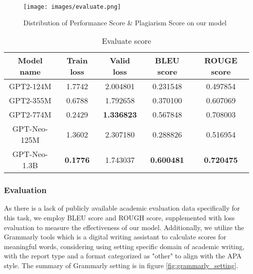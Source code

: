 \documentclass[conference]{IEEEtran}
\begin{document}
\begin{figure}[ht]
    \centerline{\texttt{[image: images/evaluate.png]}}
    \caption{Distribution of Performance Score \& Plagiarism Score on our model}
    \label{fig:evaluate}
\end{figure}
\begin{table}[!h]
    \begin{center}
        \caption{Evaluate score} 
        \begin{tabular}{|c|c|c|c|c|} 
             \hline
              Model name & Train loss & Valid loss & BLEU score & ROUGE score \\ [1ex] 
            \hline

             GPT2-124M & 1.7742 & 2.004801 & 0.231548 & 0.497854 \\ [1ex] 

             GPT2-355M & 0.6788 & 1.792658 & 0.370100 & 0.607069 \\ [1ex] 

             GPT2-774M & 0.2429 & \textbf{1.336823} & 0.567848 & 0.708003 \\ [1ex] 

             GPT-Neo-125M & 1.3602 & 2.307180 & 0.288826 & 0.516954 \\ [1ex] 

             GPT-Neo-1.3B & \textbf{0.1776} & 1.743037 & \textbf{0.600481} & \textbf{0.720475} \\ [1ex] 
             \hline
        \end{tabular}
    \end{center}
    \label{table:eval_score}
    
\end{table}



\subsubsection{Evaluation} 
As there is a lack of publicly available academic evaluation data specifically for this task, we employ BLEU \cite{bleu-metric} score and ROUGH \cite{rouge-metric} score, supplemented with loss evaluation to measure the effectiveness of our model. Additionally, we utilize the Grammarly tools which is a digital writing assistant to calculate scores for meaningful words, considering using setting specific domain of academic writing, with the report type and a format categorized as "other" to align with the APA style. The summary of Grammarly setting is in figure \ref{fig:grammarly_setting}. 
\end{document}
